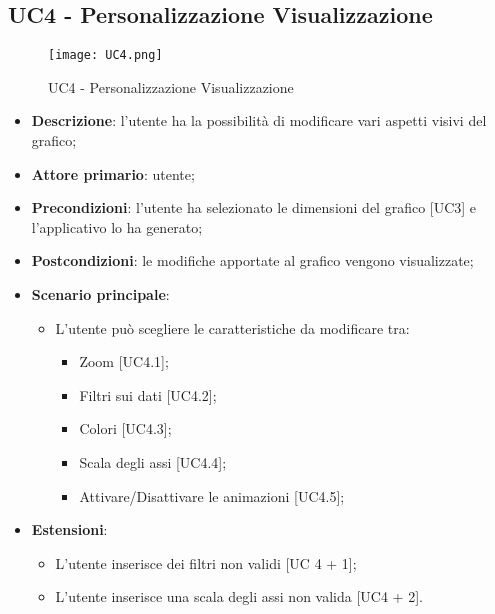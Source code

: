 \begin{itemize}
\section{UC4 - Personalizzazione Visualizzazione}

\begin{figure}[h]
  \centering
  \texttt{[image: UC4.png]}
  \caption{UC4 - Personalizzazione Visualizzazione}
\end{figure}

\begin{itemize}
  \item \textbf{Descrizione}: l'utente ha la possibilità di modificare vari aspetti visivi del grafico;
  \item \textbf{Attore primario}: utente;
  \item \textbf{Precondizioni}: l'utente ha selezionato le dimensioni del grafico [UC3] e l'applicativo lo ha generato;
  \item \textbf{Postcondizioni}: le modifiche apportate al grafico vengono visualizzate;
  \item \textbf{Scenario principale}: 
  \begin{itemize}
    \item L'utente può scegliere le caratteristiche da modificare tra: 
      \begin{itemize}
        \item Zoom [UC4.1];
        \item Filtri sui dati [UC4.2];
        \item Colori [UC4.3];
        \item Scala degli assi [UC4.4];
        \item Attivare/Disattivare le animazioni [UC4.5];
      \end{itemize}
  \end{itemize}
  \item \textbf{Estensioni}: 
    \begin{itemize}
      \item L'utente inserisce dei filtri non validi [UC 4 + 1];
      \item L'utente inserisce una scala degli assi non valida [UC4 + 2].
    \end{itemize}
\end{itemize}


\end{itemize}
